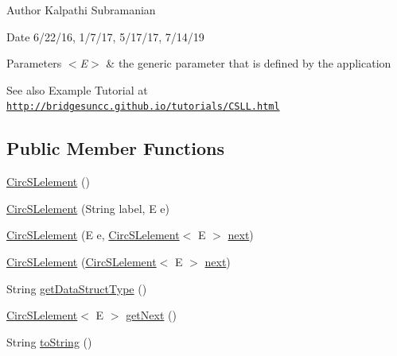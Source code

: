\begin{DoxyAuthor}{Author}
Kalpathi Subramanian
\end{DoxyAuthor}
\begin{DoxyDate}{Date}
6/22/16, 1/7/17, 5/17/17, 7/14/19
\end{DoxyDate}

\begin{DoxyParams}{Parameters}
{\em $<$\+E$>$} & the generic parameter that is defined by the application\\
\hline
\end{DoxyParams}
\begin{DoxySeeAlso}{See also}
Example Tutorial at ~\newline
 \href{http://bridgesuncc.github.io/tutorials/CSLL.html}{\tt http\+://bridgesuncc.\+github.\+io/tutorials/\+C\+S\+L\+L.\+html} 
\end{DoxySeeAlso}
\subsection*{Public Member Functions}
\begin{DoxyCompactItemize}
\item 
\hyperlink{classbridges_1_1base_1_1_circ_s_lelement_a4a5a58cc7a0ec5170a828861c11df1b3}{Circ\+S\+Lelement} ()
\item 
\hyperlink{classbridges_1_1base_1_1_circ_s_lelement_a213d61713e51295d756669def911f080}{Circ\+S\+Lelement} (String label, E e)
\item 
\hyperlink{classbridges_1_1base_1_1_circ_s_lelement_ada65c593c8af7e6ed96fcdf12c26824f}{Circ\+S\+Lelement} (E e, \hyperlink{classbridges_1_1base_1_1_circ_s_lelement}{Circ\+S\+Lelement}$<$ E $>$ \hyperlink{classbridges_1_1base_1_1_s_lelement_abf61c96a74ad319d561c6952ea388e0e}{next})
\item 
\hyperlink{classbridges_1_1base_1_1_circ_s_lelement_ab9e5b98e8d917760b9651a52785358b9}{Circ\+S\+Lelement} (\hyperlink{classbridges_1_1base_1_1_circ_s_lelement}{Circ\+S\+Lelement}$<$ E $>$ \hyperlink{classbridges_1_1base_1_1_s_lelement_abf61c96a74ad319d561c6952ea388e0e}{next})
\item 
String \hyperlink{classbridges_1_1base_1_1_circ_s_lelement_ad56acddc52e8e0b6869a6f24f1e0a90e}{get\+Data\+Struct\+Type} ()
\item 
\hyperlink{classbridges_1_1base_1_1_circ_s_lelement}{Circ\+S\+Lelement}$<$ E $>$ \hyperlink{classbridges_1_1base_1_1_circ_s_lelement_ae18b07e3f1d37b5eca0cae22efc0d395}{get\+Next} ()
\item 
String \hyperlink{classbridges_1_1base_1_1_circ_s_lelement_af307188926766e73efb988f102ce9740}{to\+String} ()
\end{DoxyCompactItemize}
